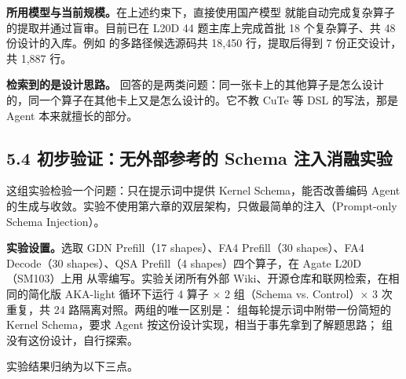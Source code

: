\textbf{所用模型与当前规模。}在上述约束下，直接使用国产模型  就能自动完成复杂算子的提取并通过盲审。目前已在 L20D 44 题主库上完成首批 18 个复杂算子、共 48 份设计的入库。例如  的多路径候选源码共 18,450 行，提取后得到 7 份正交设计，共 1,887 行。


\textbf{检索到的是设计思路。} 回答的是两类问题：同一张卡上的其他算子是怎么设计的，同一个算子在其他卡上又是怎么设计的。它不教 CuTe 等 DSL 的写法，那是 Agent 本来就擅长的部分。

\newpage

\subsection{5.4 初步验证：无外部参考的 Schema 注入消融实验}
这组实验检验一个问题：只在提示词中提供 Kernel Schema，能否改善编码 Agent 的生成与收敛。实验不使用第六章的双层架构，只做最简单的注入（Prompt-only Schema Injection）。


\textbf{实验设置。}选取 GDN Prefill（17 shapes）、FA4 Prefill（30 shapes）、FA4 Decode（30 shapes）、QSA Prefill（4 shapes）四个算子，在 Agate L20D（SM103）上用  从零编写。实验关闭所有外部 Wiki、开源仓库和联网检索，在相同的简化版 AKA-light 循环下运行 4 算子 × 2 组（Schema vs. Control）× 3 次重复，共 24 路隔离对照。两组的唯一区别是： 组每轮提示词中附带一份简短的 Kernel Schema，要求 Agent 按这份设计实现，相当于事先拿到了解题思路； 组没有这份设计，自行探索。

实验结果归纳为以下三点。


